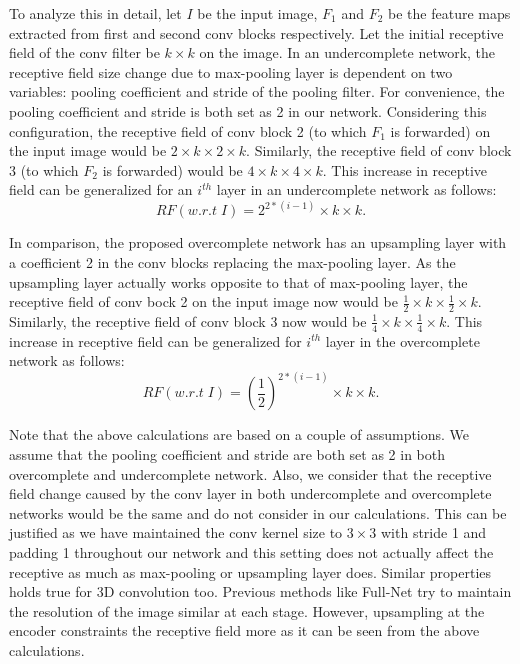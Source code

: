 \documentclass[journal,twoside,web]{ieeecolor}
\begin{document}
To analyze this in detail, let $I$ be the input image, $F_1$ and $F_2$ be the feature maps extracted from first and second conv blocks respectively. Let the initial receptive field of the conv filter be $k \times k$ on the image. In an undercomplete network, the receptive field size change due to max-pooling layer is dependent on two variables: pooling coefficient and stride of the pooling filter. For convenience, the pooling coefficient and stride is both set as 2 in our network. Considering this configuration, the receptive field of conv block 2 (to which $F_1$ is forwarded) on the input image would be $ 2 \times k \times 2 \times k$. Similarly, the receptive field of conv block 3 (to which $F_2$ is forwarded) would be $ 4 \times k \times 4 \times k$. This increase in receptive field can be generalized for an $i^{th}$ layer in an undercomplete network as follows:
\[ RF (w.r.t \; I) =  2^{2*(i-1)} \times k \times k. \]









In comparison, the proposed overcomplete network has an upsampling layer with a coefficient 2 in the conv blocks replacing the max-pooling layer. As the upsampling layer actually works  opposite to that of max-pooling layer, the receptive field of conv bock 2 on the input image now would be $ \frac{1}{2} \times k \times \frac{1}{2} \times k$. Similarly, the receptive field of conv block 3  now would be $ \frac{1}{4} \times k \times \frac{1}{4} \times k$. This increase in receptive field can be generalized for $i^{th}$ layer in the overcomplete network as follows:  
\[ RF (w.r.t \; I) =  \left(\frac{1}{2}\right)^{2*(i-1)} \times k \times k. \]

Note that the above calculations are based on a couple of assumptions. We assume that the pooling coefficient and stride are both set as 2 in both overcomplete and undercomplete network. Also, we consider that the receptive field change caused by the conv layer in both undercomplete and overcomplete networks would be the same and do not consider in our calculations. This can be justified as we have maintained the conv kernel size to $3 \times 3$ with stride 1 and padding 1 throughout our network and this setting does not actually affect the receptive as much as max-pooling or upsampling layer does. Similar properties holds true for 3D convolution too. Previous methods like Full-Net try to maintain the resolution of the image similar at each stage. However, upsampling at the encoder constraints the receptive field more as it can be seen from the above calculations. 
\end{document}
